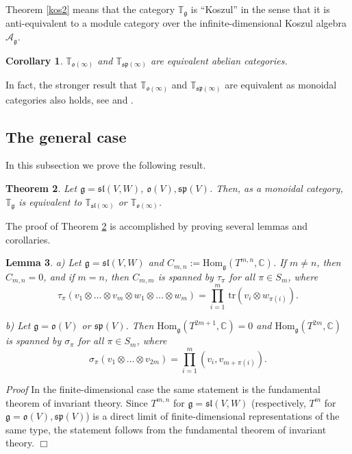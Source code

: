 \documentclass{svmult}
\newtheorem{theo}{Theorem}[section]
\newtheorem{lem}[theo]{Lemma}
\newtheorem{cor}[theo]{Corollary}
\renewenvironment{proof}{ \emph{Proof}}{$\Box$}
\newcommand {\CC} {\mathbb {C}}
\newcommand{\TT}{\mathbb{T}}
\renewcommand{\sp}{\mathfrak{sp}}
\renewcommand{\sl}{\mathfrak{sl}}
\newcommand{\oo}{\mathfrak{o}}
\renewcommand{\gg}{\mathfrak{g}}
\newcommand{\tr}{\mathrm{tr}}
\newcommand{\Hom}{\mathrm{Hom}}
\begin{document}
Theorem \ref{kos2} means that the category $\TT_\gg$ is ``Koszul'' in the sense that it is anti-equivalent to a module category over the infinite-dimensional 
Koszul algebra $\mathcal{A}_\gg$. 

\begin{cor}
$\TT_{\oo(\infty)}$ and  $\TT_{\sp(\infty)}$ are equivalent abelian categories.
\end{cor}

In fact, the stronger result that $\TT_{\oo(\infty)}$ and  $\TT_{\sp(\infty)}$ are equivalent as monoidal categories also holds, see \cite{SS} and \cite{S}.

\vspace{0.5cm}

\subsection{The general case}\label{sect:5.2}
In this subsection we prove the following result.
\begin{theo}\label{equivmain} 
Let $\gg=\sl(V,W)$, $\oo(V), \sp(V)$. Then, as a monoidal category, $\TT_\gg$ is equivalent to $\TT_{\sl(\infty)}$ or  $\TT_{\oo(\infty)}$.
\end{theo}

The proof of Theorem \ref{equivmain} is accomplished by proving several lemmas and corollaries. 

\begin{lem}\label{inv1} 
a) Let $\gg=\sl(V,W)$ and $C_{m,n}:=\Hom_\gg(T^{m,n},\CC)$. If $m\neq n$, then $C_{m,n}=0$, and if $m=n$, then
$C_{m,m}$ is spanned by $\tau_\pi$ for all $\pi\in S_m$, where
$$\tau_\pi(v_1\otimes\dots\otimes v_m\otimes w_1\otimes \dots\otimes w_m)=\prod_{i=1}^m\,\tr(v_i\otimes w_{\pi(i)}).$$

b) Let  $\gg=\oo(V)$ or $\sp(V)$. Then $\Hom_\gg(T^{2m+1},\CC)=0$  and $\Hom_\gg(T^{2m},\CC)$ is spanned by
$\sigma_\pi$  for all $\pi\in S_m$, where
$$\sigma_\pi(v_1\otimes\dots\otimes v_{2m})=\prod_{i=1}^m(v_i,v_{m+\pi(i)}).$$
\end{lem}

\begin{proof} In the finite-dimensional case the same statement is the fundamental theorem of invariant theory. Since $T^{m,n}$ for $\gg = \sl(V,W)$ (respectively, $T^m$ for $\gg = \oo(V),\sp(V)$) is a direct limit of finite-dimensional representations of the same type, the statement follows from the fundamental theorem of invariant theory. 
\end{proof}
\end{document}
